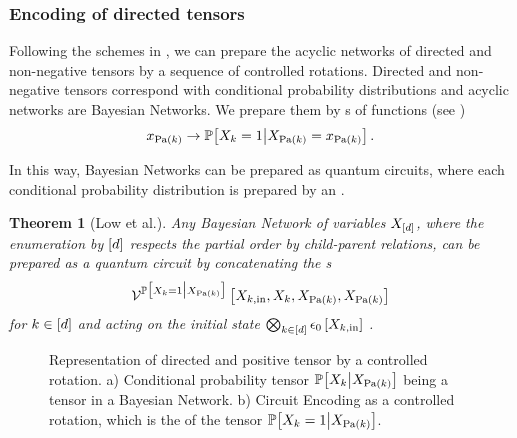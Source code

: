 \documentclass[aps,onecolumn,nofootinbib,pra]{article}
\newtheorem{theorem}{Theorem}
\begin{document}
    \subsubsection{Encoding of directed tensors}

    Following the schemes in \cite{low_quantum_2014}, we can prepare the acyclic networks of directed and non-negative tensors by a sequence of controlled rotations.
    Directed and non-negative tensors correspond with conditional probability distributions and acyclic networks are Bayesian Networks.
    We prepare them by \activationCircuit{}s of functions (see )
    \begin{align*}
        x_{\mathrm{Pa}(k)} \rightarrow \mathbb{P}\big[X_{k}=1\big|X_{\mathrm{Pa}(k)}=x_{\mathrm{Pa}(k)}\big] \, .
    \end{align*}

    In this way, Bayesian Networks can be prepared as quantum circuits, where each conditional probability distribution is prepared by an \activationCircuit{}.

    \begin{theorem}[Low et al.]
        Any Bayesian Network of variables $X_{[d]}$, where the enumeration by $[d]$ respects the partial order by child-parent relations, can be prepared as a quantum circuit by concatenating the \activationCircuit{}s
        \begin{align*}
            \mathcal{V}^{
                \mathbb{P}\big[X_{k}=1\big|X_{\mathrm{Pa}(k)}\big]
            }\left[X_{k,\mathrm{in}},X_{k},X_{\mathrm{Pa}(k)},X_{\mathrm{Pa}(k)}\right]
        \end{align*}
        for $k\in[d]$ and acting on the initial state $\bigotimes_{k\in[d]}\epsilon_{0}\left[X_{k,\mathrm{in}}\right]$ .
    \end{theorem}



    \begin{figure}
        \begin{center}
            
        \end{center}
        \caption{
            Representation of directed and positive tensor by a controlled rotation.
            a) Conditional probability tensor $\mathbb{P}\big[X_{k}\big|X_{\mathrm{Pa}(k)}\big]$ being a tensor in a Bayesian Network.
            b) Circuit Encoding as a controlled rotation, which is the \ActivationCircuit{} of the tensor $\mathbb{P}\big[X_{k}=1\big|X_{\mathrm{Pa}(k)}\big]$.
        }\label{fig:cpdEncoding}
    \end{figure}
\end{document}
